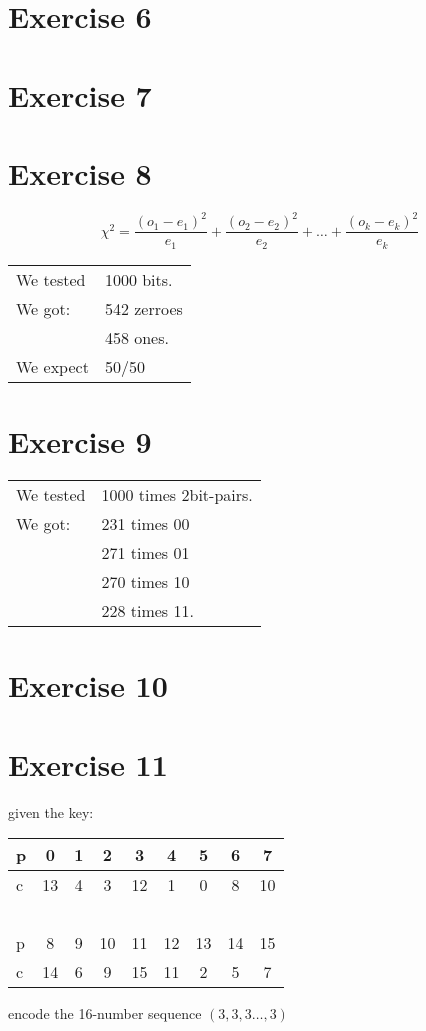 \section{Exercise 6}

\section{Exercise 7}

\section{Exercise 8}

\begin{equation*}
\chi^2=\frac{(o_1-e_1)^2}{e_1} + \frac{(o_2-e_2)^2}{e_2} +
\ldots + \frac{(o_k-e_k)^2}{e_k}
\end{equation*}
\begin{tabular}{ll}
We tested &	1000 bits.\\
We got: &	542 zerroes\\
		&	458 ones.\\
We expect &	50/50
\end{tabular}



\section{Exercise 9}
\begin{tabular}{ll}
We tested &1000 times 2bit-pairs.\\
We got: &231 times 00\\
		&271 times 01\\
		&270 times 10\\
		&228 times 11.
\end{tabular}

\section{Exercise 10}


\section{Exercise 11}
given the key:
\begin{center}
	\begin{tabular}{ l|cccccccc}
	  p & 0 & 1 & 2 & 3 & 4 & 5 & 6 & 7\\ \hline
	  c & 13 & 4 & 3 & 12 & 1 & 0 & 8 & 10\\
	    ~\\
	  p & 8 & 9 & 10 & 11 & 12 & 13 & 14 & 15\\ \hline
	  c & 14 & 6 & 9 & 15 & 11 & 2 & 5 & 7\\
	\end{tabular}
\end{center}
encode the 16-number sequence $(3,3,3\dots,3)$